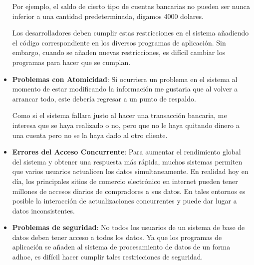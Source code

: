 \documentclass[12pt, fleqn]{report}                             %
\begin{document}
\begin{itemize}
                        Por ejemplo, el saldo de cierto tipo de cuentas bancarias no pueden ser nunca
                        inferior a una cantidad predeterminada, digamos 4000 dolares.

                        Los desarrolladores deben cumplir estas restricciones en el sistema añadiendo
                        el código correspondiente en los diversos programas de aplicación. Sin embargo,
                        cuando se añaden nuevas restricciones, es difícil cambiar los programas para
                        hacer que se cumplan. 

                \item
                    \textbf{Problemas con Atomicidad}:
                        Si ocurriera un problema en el sistema al momento de estar modificando la información
                        me gustaria que al volver a arrancar todo, este debería regresar a un punto de
                        respaldo.

                        Como si el sistema fallara justo al hacer una transacción bancaria, me interesa que 
                        se haya realizado o no, pero que no le haya quitando dinero a una cuenta pero no se la
                        haya dado al otro cliente. 


                \item
                    \textbf{Errores del Acceso Concurrente}:
                        Para aumentar el rendimiento global del sistema y obtener una respuesta más
                        rápida, muchos sistemas permiten que varios usuarios actualicen los datos
                        simultaneamente. En realidad hoy en día, los principales sitios de comercio
                        electrónico en internet pueden tener millones de accesos diarios de compradores
                        a sus datos. En tales entornos es posible la interacción de actualizaciones
                        concurrentes y puede dar lugar a datos inconsistentes.


                \item
                    \textbf{Problemas de seguridad}:
                        No todos los usuarios de un sistema de base de datos deben tener acceso a todos
                        los datos. Ya que los programas de aplicación se añaden al sistema de
                        procesamiento de datos de un forma adhoc, es difícil hacer cumplir tales
                        restricciones de seguridad.

            \end{itemize}
\end{document}
